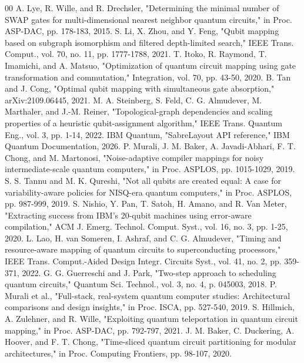 \documentclass[conference]{IEEEtran}
\begin{document}
\begin{thebibliography}{00}
 A. Lye, R. Wille, and R. Drechsler, "Determining the minimal number of SWAP gates for multi-dimensional nearest neighbor quantum circuits," in Proc. ASP-DAC, pp. 178-183, 2015.
 S. Li, X. Zhou, and Y. Feng, "Qubit mapping based on subgraph isomorphism and filtered depth-limited search," IEEE Trans. Comput., vol. 70, no. 11, pp. 1777-1788, 2021.
 T. Itoko, R. Raymond, T. Imamichi, and A. Matsuo, "Optimization of quantum circuit mapping using gate transformation and commutation," Integration, vol. 70, pp. 43-50, 2020.
 B. Tan and J. Cong, "Optimal qubit mapping with simultaneous gate absorption," arXiv:2109.06445, 2021.
 M. A. Steinberg, S. Feld, C. G. Almudever, M. Marthaler, and J.-M. Reiner, "Topological-graph dependencies and scaling properties of a heuristic qubit-assignment algorithm," IEEE Trans. Quantum Eng., vol. 3, pp. 1-14, 2022.
 IBM Quantum, "SabreLayout API reference," IBM Quantum Documentation, 2026.
 P. Murali, J. M. Baker, A. Javadi-Abhari, F. T. Chong, and M. Martonosi, "Noise-adaptive compiler mappings for noisy intermediate-scale quantum computers," in Proc. ASPLOS, pp. 1015-1029, 2019.
 S. S. Tannu and M. K. Qureshi, "Not all qubits are created equal: A case for variability-aware policies for NISQ-era quantum computers," in Proc. ASPLOS, pp. 987-999, 2019.
 S. Nishio, Y. Pan, T. Satoh, H. Amano, and R. Van Meter, "Extracting success from IBM's 20-qubit machines using error-aware compilation," ACM J. Emerg. Technol. Comput. Syst., vol. 16, no. 3, pp. 1-25, 2020.
 L. Lao, H. van Someren, I. Ashraf, and C. G. Almudever, "Timing and resource-aware mapping of quantum circuits to superconducting processors," IEEE Trans. Comput.-Aided Design Integr. Circuits Syst., vol. 41, no. 2, pp. 359-371, 2022.
 G. G. Guerreschi and J. Park, "Two-step approach to scheduling quantum circuits," Quantum Sci. Technol., vol. 3, no. 4, p. 045003, 2018.
 P. Murali et al., "Full-stack, real-system quantum computer studies: Architectural comparisons and design insights," in Proc. ISCA, pp. 527-540, 2019.
 S. Hillmich, A. Zulehner, and R. Wille, "Exploiting quantum teleportation in quantum circuit mapping," in Proc. ASP-DAC, pp. 792-797, 2021.
 J. M. Baker, C. Duckering, A. Hoover, and F. T. Chong, "Time-sliced quantum circuit partitioning for modular architectures," in Proc. Computing Frontiers, pp. 98-107, 2020.

\end{thebibliography}
\end{document}
